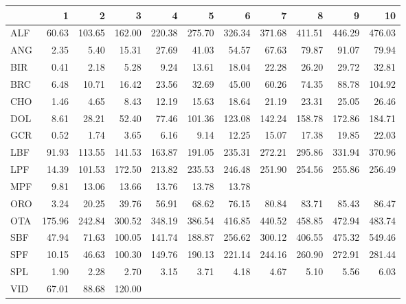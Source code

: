 \documentclass[11pt]{article}
\begin{document}
\begin{itemize}
\begin{center}
\begin{tabular}{lrrrrrrrrrr}
      &       1  &       2  &       3  &       4  &       5  &       6  &       7  &       8  &       9  &      10  \\
\hline
 ALF  &   60.63  &  103.65  &  162.00  &  220.38  &  275.70  &  326.34  &  371.68  &  411.51  &  446.29  &  476.03  \\
 ANG  &    2.35  &    5.40  &   15.31  &   27.69  &   41.03  &   54.57  &   67.63  &   79.87  &   91.07  &   79.94  \\
 BIR  &    0.41  &    2.18  &    5.28  &    9.24  &   13.61  &   18.04  &   22.28  &   26.20  &   29.72  &   32.81  \\
 BRC  &    6.48  &   10.71  &   16.42  &   23.56  &   32.69  &   45.00  &   60.26  &   74.35  &   88.78  &  104.92  \\
 CHO  &    1.46  &    4.65  &    8.43  &   12.19  &   15.63  &   18.64  &   21.19  &   23.31  &   25.05  &   26.46  \\
 DOL  &    8.61  &   28.21  &   52.40  &   77.46  &  101.36  &  123.08  &  142.24  &  158.78  &  172.86  &  184.71  \\
 GCR  &    0.52  &    1.74  &    3.65  &    6.16  &    9.14  &   12.25  &   15.07  &   17.38  &   19.85  &   22.03  \\
 LBF  &   91.93  &  113.55  &  141.53  &  163.87  &  191.05  &  235.31  &  272.21  &  295.86  &  331.94  &  370.96  \\
 LPF  &   14.39  &  101.53  &  172.50  &  213.82  &  235.53  &  246.48  &  251.90  &  254.56  &  255.86  &  256.49  \\
 MPF  &    9.81  &   13.06  &   13.66  &   13.76  &   13.78  &   13.78  &          &          &          &          \\
 ORO  &    3.24  &   20.25  &   39.76  &   56.91  &   68.62  &   76.15  &   80.84  &   83.71  &   85.43  &   86.47  \\
 OTA  &  175.96  &  242.84  &  300.52  &  348.19  &  386.54  &  416.85  &  440.52  &  458.85  &  472.94  &  483.74  \\
 SBF  &   47.94  &   71.63  &  100.05  &  141.74  &  188.87  &  256.62  &  300.12  &  406.55  &  475.32  &  549.46  \\
 SPF  &   10.15  &   46.63  &  100.30  &  149.76  &  190.13  &  221.14  &  244.16  &  260.90  &  272.91  &  281.44  \\
 SPL  &    1.90  &    2.28  &    2.70  &    3.15  &    3.71  &    4.18  &    4.67  &    5.10  &    5.56  &    6.03  \\
 VID  &   67.01  &   88.68  &  120.00  &          &          &          &          &          &          &          \\
\end{tabular}
\end{center}



\end{itemize}
\end{document}

